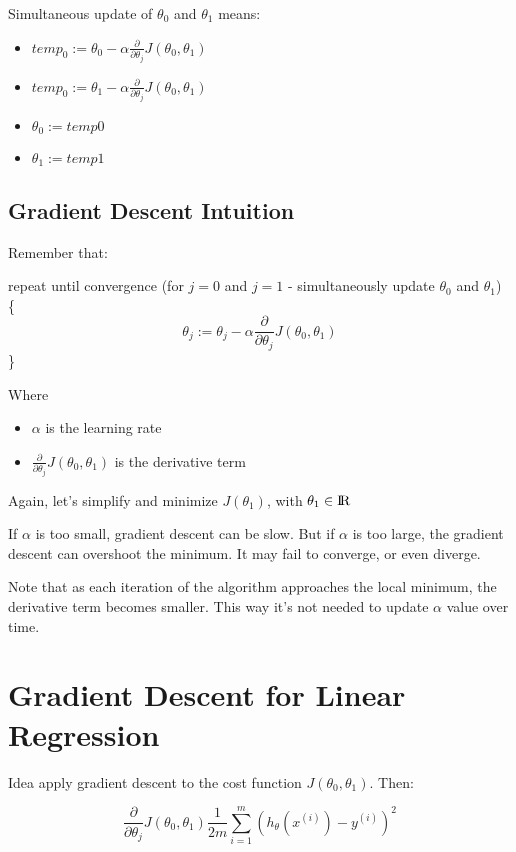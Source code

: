 \documentclass[a4paper]{article}
\begin{document}
Simultaneous update of $\theta_0$ and $\theta_1$ means:

\begin{itemize}
\item $temp_0 := \theta_0 - \alpha \frac{\partial}{\partial \theta_j}J(\theta_0, \theta_1)$
\item $temp_0 := \theta_1 - \alpha \frac{\partial}{\partial \theta_j}J(\theta_0, \theta_1)$
\item $\theta_0 := temp0$
\item $\theta_1 := temp1$
\end{itemize}

\subsection{Gradient Descent Intuition}

Remember that:

\medskip

repeat until convergence (for $j=0$ and $j=1$ - simultaneously update $\theta_0$ and $\theta_1$) \{
$$
\theta_j := \theta_j - \alpha \frac{\partial}{\partial \theta_j}J(\theta_0, \theta_1)
$$
\}

Where\:

\begin{itemize}
\item $\alpha$ is the learning rate
\item $\frac{\partial}{\partial \theta_j}J(\theta_0,\theta_1)$ is the derivative term
\end{itemize}

Again, let's simplify and minimize $J(\theta_1)$, with $\theta_1 \in \rm I\!R$

If $\alpha$ is too small, gradient descent can be slow.  But if $\alpha$ is too large, the gradient descent can overshoot the minimum. It may fail to converge, or even diverge.

Note that as each iteration of the algorithm approaches  the local minimum, the derivative term becomes smaller. This way it's not needed to update $\alpha$ value over time.

\section{Gradient Descent for Linear Regression}

Idea\: apply gradient descent to the cost function $J(\theta_0, \theta_1)$. Then:

$$
\frac{\partial}{\partial \theta_j}J(\theta_0,\theta_1) \frac{1}{2m}\sum_{i=1}^{m}(h_\theta(x^{(i)}) - y^{(i)})^2
$$
\end{document}
